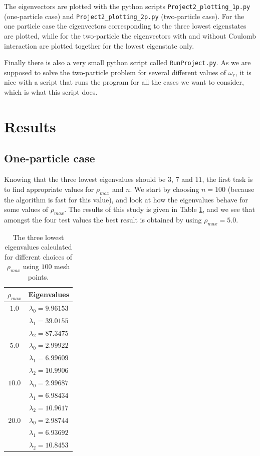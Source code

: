\documentclass[12pt, a4paper]{article}
\begin{document}
The eigenvectors are plotted with the python scripts \texttt{Project2\_plotting\_1p.py} 
(one-particle case) and \texttt{Project2\_plotting\_2p.py} (two-particle case). For the one particle case 
the eigenvectors corresponding to the three lowest eigenstates are plotted, while for the two-particle 
the eigenvectors with and without Coulomb interaction are plotted together for the lowest eigenstate only.

Finally there is also a very small python script called \texttt{RunProject.py}. As we are supposed to 
solve the two-particle problem for several different values of $\omega_r$, it is nice with a script that 
runs the program for all the cases we want to consider, which is what this script does. 

\section{Results}

\subsection{One-particle case}

Knowing that the three lowest eigenvalues should be $3$, $7$ and $11$, the first task is to find 
appropriate values for $\rho_{max}$ and $n$. We start by choosing $n=100$ (because the algorithm is 
fast for this value), and look at how the eigenvalues behave for some values of $\rho_{max}$. 
The results of this study is given in Table \ref{tab:rho_max}, and we see that amongst the four 
test values the best result is obtained by using $\rho_{max} = 5.0$. 

\begin{table}[ht!]
\begin{center}
\caption{The three lowest eigenvalues calculated for different choices of $\rho_{max}$ using 
$100$ mesh points.}
\label{tab:rho_max}
\begin{tabular}{cc} \\ \hline\hline  
$\rho_{max}$ & Eigenvalues \\ \hline 
$1.0$ & $\lambda_0 = 9.96153$  \\
	  & $\lambda_1 = 39.0155$  \\
	  & $\lambda_2 = 87.3475$  \\  \hline 
$5.0$ & $\lambda_0 = 2.99922$  \\
	  & $\lambda_1 = 6.99609$  \\
	  & $\lambda_2 = 10.9906$  \\  \hline 
$10.0$ & $\lambda_0 = 2.99687$  \\
	  & $\lambda_1 = 6.98434$  \\
	  & $\lambda_2 = 10.9617$  \\  \hline 
$20.0$ & $\lambda_0 = 2.98744$  \\
	  & $\lambda_1 = 6.93692$  \\
	  & $\lambda_2 = 10.8453$  \\  \hline \hline 	  
\end{tabular}
\end{center}
\end{table} 
\end{document}
